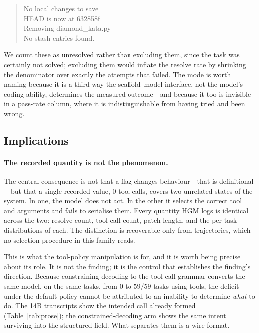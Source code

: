 \documentclass{article}
\begin{document}
\begin{quote}\small\ttfamily
No local changes to save\\
HEAD is now at 632858f\\
Removing diamond\_kata.py\\
No stash entries found.
\end{quote}

We count these as unresolved rather than excluding them, since the task was
certainly not solved; excluding them would inflate the resolve rate by
shrinking the denominator over exactly the attempts that failed. The mode is
worth naming because it is a third way the scaffold--model interface, not the
model's coding ability, determines the measured outcome---and because it too
is invisible in a pass-rate column, where it is indistinguishable from having
tried and been wrong.

\subsection{Implications}

\paragraph{The recorded quantity is not the phenomenon.}
The central consequence is not that a flag changes behaviour---that is
definitional---but that a single recorded value, $0$ tool calls, covers two
unrelated states of the system. In one, the model does not act. In the other
it selects the correct tool and arguments and fails to serialise them. Every
quantity HGM logs is identical across the two: resolve count, tool-call
count, patch length, and the per-task distributions of each. The distinction
is recoverable only from trajectories, which no selection procedure in this
family reads.

This is what the tool-policy manipulation is for, and it is worth being
precise about its role. It is not the finding; it is the control that
establishes the finding's direction. Because constraining decoding to the
tool-call grammar converts the same model, on the same tasks, from $0$ to
$59/59$ tasks using tools, the deficit under the default policy cannot be
attributed to an inability to determine \emph{what} to do. The 14B
transcripts show the intended call already formed
(Table~\ref{tab:prose}); the constrained-decoding arm shows the same intent
surviving into the structured field. What separates them is a wire format.
\end{document}
